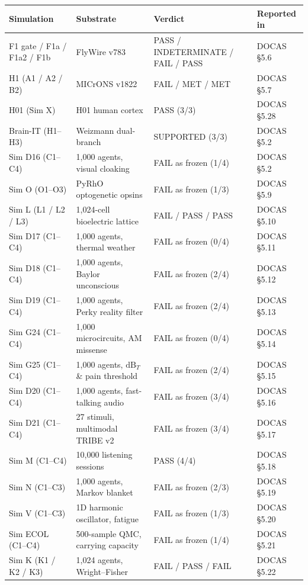 \documentclass[11pt]{article}
\begin{document}
{\footnotesize{}
\noindent\begin{tabular}{@{}p{3.4cm}lp{4.5cm}l@{}}
\hline
Simulation & Substrate & Verdict & Reported in \\
\hline
F1 gate / F1a / F1a2 / F1b & FlyWire v783 & PASS / INDETERMINATE / FAIL / PASS & DOCAS \S{}5.6 \\
H1 (A1 / A2 / B2) & MICrONS v1822 & FAIL / MET / MET & DOCAS \S{}5.7 \\
H01 (Sim X) & H01 human cortex & PASS (3/3) & DOCAS \S{}5.28 \\
Brain-IT (H1--H3) & Weizmann dual-branch & SUPPORTED (3/3) & DOCAS \S{}5.2 \\
Sim D16 (C1--C4) & 1,000 agents, visual cloaking & FAIL as frozen (1/4) & DOCAS \S{}5.2 \\
Sim O (O1--O3) & PyRhO optogenetic opsins & FAIL as frozen (1/3) & DOCAS \S{}5.9 \\
Sim L (L1 / L2 / L3) & 1,024-cell bioelectric lattice & FAIL / PASS / PASS & DOCAS \S{}5.10 \\
Sim D17 (C1--C4) & 1,000 agents, thermal weather & FAIL as frozen (0/4) & DOCAS \S{}5.11 \\
Sim D18 (C1--C4) & 1,000 agents, Baylor unconscious & FAIL as frozen (2/4) & DOCAS \S{}5.12 \\
Sim D19 (C1--C4) & 1,000 agents, Perky reality filter & FAIL as frozen (2/4) & DOCAS \S{}5.13 \\
Sim G24 (C1--C4) & 1,000 microcircuits, AM missense & FAIL as frozen (0/4) & DOCAS \S{}5.14 \\
Sim G25 (C1--C4) & 1,000 agents, $\text{dB}_T$ \& pain threshold & FAIL as frozen (2/4) & DOCAS \S{}5.15 \\
Sim D20 (C1--C4) & 1,000 agents, fast-talking audio & FAIL as frozen (3/4) & DOCAS \S{}5.16 \\
Sim D21 (C1--C4) & 27 stimuli, multimodal TRIBE v2 & FAIL as frozen (3/4) & DOCAS \S{}5.17 \\
Sim M (C1--C4) & 10,000 listening sessions & PASS (4/4) & DOCAS \S{}5.18 \\
Sim N (C1--C3) & 1,000 agents, Markov blanket & FAIL as frozen (2/3) & DOCAS \S{}5.19 \\
Sim V (C1--C3) & 1D harmonic oscillator, fatigue & FAIL as frozen (1/3) & DOCAS \S{}5.20 \\
Sim ECOL (C1--C4) & 500-sample QMC, carrying capacity & FAIL as frozen (1/4) & DOCAS \S{}5.21 \\
Sim K (K1 / K2 / K3) & 1,024 agents, Wright--Fisher & FAIL / PASS / FAIL & DOCAS \S{}5.22 \\

\end{tabular}}
\end{document}
